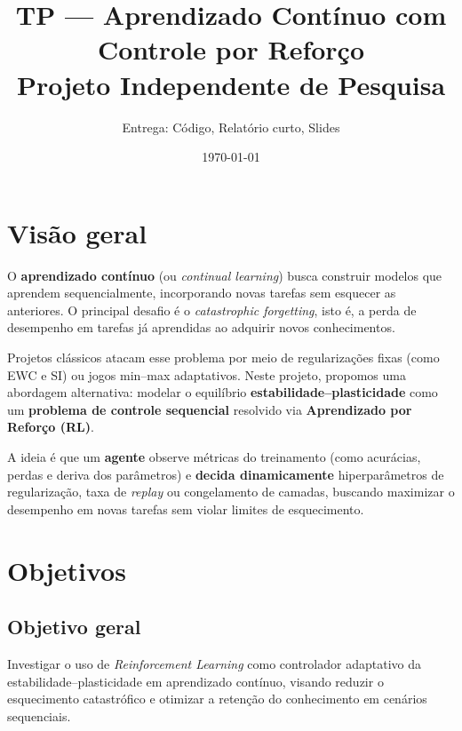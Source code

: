 \documentclass[9pt,a4paper]{extarticle}
\title{\textbf{TP — Aprendizado Contínuo com Controle por Reforço}\\\large Projeto Independente de Pesquisa}
\author{Entrega: Código, Relatório curto, Slides}
\date{\today}
\begin{document}
\maketitle

\section{Visão geral}
O \textbf{aprendizado contínuo} (ou \emph{continual learning}) busca construir modelos que aprendem sequencialmente, incorporando novas tarefas sem esquecer as anteriores. O principal desafio é o \textit{catastrophic forgetting}, isto é, a perda de desempenho em tarefas já aprendidas ao adquirir novos conhecimentos.

Projetos clássicos atacam esse problema por meio de regularizações fixas (como EWC e SI) ou jogos min–max adaptativos. Neste projeto, propomos uma abordagem alternativa: modelar o equilíbrio \textbf{estabilidade–plasticidade} como um \textbf{problema de controle sequencial} resolvido via \textbf{Aprendizado por Reforço (RL)}.

A ideia é que um \textbf{agente} observe métricas do treinamento (como acurácias, perdas e deriva dos parâmetros) e \textbf{decida dinamicamente} hiperparâmetros de regularização, taxa de \textit{replay} ou congelamento de camadas, buscando maximizar o desempenho em novas tarefas sem violar limites de esquecimento.

\section{Objetivos}

\subsection*{Objetivo geral}
Investigar o uso de \textit{Reinforcement Learning} como controlador adaptativo da estabilidade–plasticidade em aprendizado contínuo, visando reduzir o esquecimento catastrófico e otimizar a retenção do conhecimento em cenários sequenciais.
\end{document}
